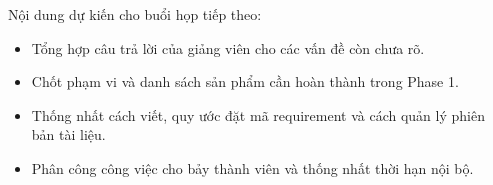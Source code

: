 \documentclass[10pt,a4paper]{article}
\begin{document}
\begin{samepage}
\noindent Nội dung dự kiến cho buổi họp tiếp theo:

\begin{itemize}
  \item Tổng hợp câu trả lời của giảng viên cho các vấn đề còn chưa rõ.
  \item Chốt phạm vi và danh sách sản phẩm cần hoàn thành trong Phase 1.
  \item Thống nhất cách viết, quy ước đặt mã requirement và cách quản lý phiên bản tài liệu.
  \item Phân công công việc cho bảy thành viên và thống nhất thời hạn nội bộ.
\end{itemize}
\end{samepage}
\end{document}
